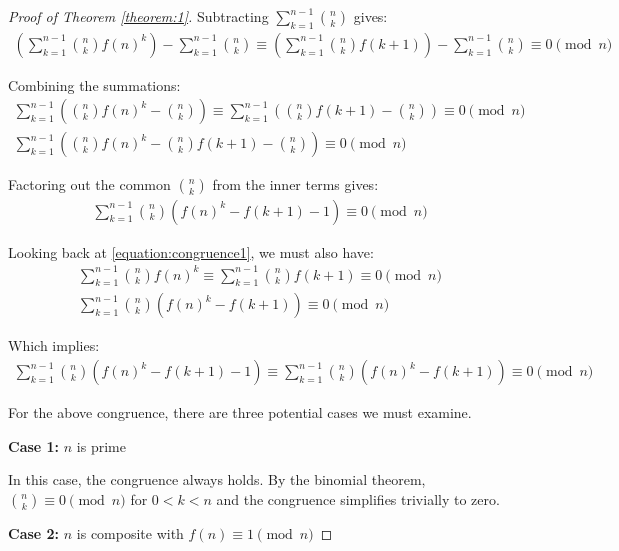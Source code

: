 \documentclass{article}
\theoremstyle{plain}
\theoremstyle{definition}
\begin{document}
\begin{proof}[Proof of Theorem \ref{theorem:1}]
Subtracting $\sum_{k=1}^{n-1} \binom{n}{k}$ gives:
\begin{align}
\left(\sum_{k=1}^{n-1} \binom{n}{k} f(n)^k\right) - \sum_{k=1}^{n-1} \binom{n}{k} \equiv \left(\sum_{k=1}^{n-1} \binom{n}{k} f(k+1)\right) - \sum_{k=1}^{n-1} \binom{n}{k} \equiv 0 \pmod{n}
\end{align}

Combining the summations:
\begin{align}
\sum_{k=1}^{n-1} \left(\binom{n}{k} f(n)^k - \binom{n}{k}\right) \equiv \sum_{k=1}^{n-1} \left(\binom{n}{k} f(k+1) - \binom{n}{k}\right) \equiv 0 \pmod{n} \\
\sum_{k=1}^{n-1} \left(\binom{n}{k} f(n)^k - \binom{n}{k} f(k+1) - \binom{n}{k}\right) \equiv 0 \pmod{n}
\end{align}

Factoring out the common $\binom{n}{k}$ from the inner terms gives:
\begin{align}
\sum_{k=1}^{n-1} \binom{n}{k} \left(f(n)^k - f(k+1) - 1\right) \equiv 0 \pmod{n}
\end{align}

Looking back at \cref{equation:congruence1}, we must also have:
\begin{align}
    \sum_{k=1}^{n-1} \binom{n}{k} f(n)^k \equiv \sum_{k=1}^{n-1} \binom{n}{k} f(k+1) \equiv 0 \pmod{n} \\
    \sum_{k=1}^{n-1} \binom{n}{k} \left(f(n)^k - f(k+1)\right) \equiv 0 \pmod{n}
\end{align}

Which implies:
\begin{align}
\sum_{k=1}^{n-1} \binom{n}{k} \left(f(n)^k - f(k+1) - 1\right) \equiv \sum_{k=1}^{n-1} \binom{n}{k} \left(f(n)^k - f(k+1)\right) \equiv 0 \pmod{n}
\end{align}

For the above congruence, there are three potential cases we must examine.

\item \textbf{Case 1:} $n$ is prime
    
In this case, the congruence always holds. By the binomial theorem, $\binom{n}{k} \equiv 0 \pmod{n}$ for $0 < k < n$ and the congruence simplifies trivially to zero.

\item \textbf{Case 2:} $n$ is composite with $f(n) \equiv 1 \pmod{n}$


\end{proof}
\end{document}
